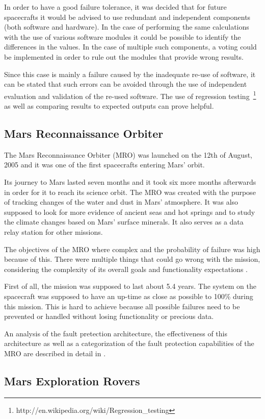 In order to have a good failure tolerance, it was decided that for future
spacecrafts it would be advised to use redundant and independent components
(both software and hardware). In the case of performing the same calculations
with the use of various software modules it could be possible to identify the
differences in the values. In the case of multiple such components, a voting
could be implemented in order to rule out the modules that provide wrong
results.

Since this case is mainly a failure caused by the inadequate re-use of
software, it can be stated that such errors can be avoided through the use of
independent evaluation and validation of the re-used software. The use of
regression testing~\footnote{http://en.wikipedia.org/wiki/Regression\_testing}
as well as comparing results to expected outputs can prove helpful.
\subsection{Mars Reconnaissance Orbiter\cite{mro-nasa}}

The Mars Reconnaissance Orbiter (MRO) was launched on the 12th of August, 2005
and it was one of the first spacecrafts entering Mars' orbit.

Its journey to Mars lasted seven months and it took six more months afterwards
in order for it to reach its science orbit. The MRO was created with the purpose
of tracking changes of the water and dust in Mars' atmosphere. It was also
supposed to look for more evidence of ancient seas and hot springs and to study
the climate changes based on Mars' surface minerals. It also serves as a data
relay station for other missions.

The objectives of the MRO where complex and the probability of failure was high
because of this. There were multiple things that could go wrong with the
mission, considering the complexity of its overall goals and functionality
expectations \cite{mro-mission}.

First of all, the mission was supposed to last about 5.4 years. The system on the spacecraft was supposed
to have an up-time as close as possible to 100\% during this mission. This is
hard to achieve because all possible failures need to be prevented or handled
without losing functionality or precious data.

An analysis of the fault pretection architecture, the effectiveness of this
architecture as well as a categorization of the fault protection capabilities of
the MRO are described in detail in \cite{surv-nasa-mars}.


\subsection{Mars Exploration Rovers}